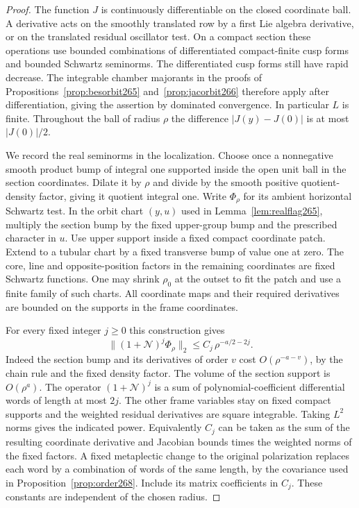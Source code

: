 \documentclass[a4paper,11pt]{article}
\theoremstyle{definition}
\theoremstyle{remark}
\numberwithin{equation}{section}
\begin{document}
\begin{proof}
The function \(J\) is continuously differentiable on the
closed coordinate ball. A derivative acts on the smoothly
translated row by a first Lie algebra derivative, or on the
translated residual oscillator test. On a compact section
these operations use bounded combinations of differentiated
compact-finite cusp forms and bounded Schwartz seminorms.
The differentiated cusp forms still have rapid decrease.
The integrable chamber majorants in the proofs of
Propositions~\ref{prop:besorbit265} and~\ref{prop:jacorbit266}
therefore apply after differentiation, giving the assertion
by dominated convergence. In particular \(L\) is finite.
Throughout the ball of radius \(\rho\) the difference
\(|J(y)-J(0)|\) is at most \(|J(0)|/2\).

We record the real seminorms in the localization. Choose
once a nonnegative smooth product bump of integral one
supported inside the open unit ball in the section coordinates.
Dilate it by \(\rho\) and divide by the smooth positive
quotient-density factor, giving it quotient integral one.
Write \(\Phi_\rho\) for its ambient horizontal Schwartz test.
In the orbit chart \((y,u)\) used in
Lemma~\ref{lem:realflag265}, multiply the section bump by
the fixed upper-group bump and the prescribed character in
\(u\). Use upper support inside a fixed compact coordinate
patch. Extend to a tubular chart by a fixed transverse bump
of value one at zero. The core, line and opposite-position factors in the remaining
coordinates are fixed Schwartz functions. One may shrink \(\rho_0\) at
the outset to fit the patch and use a finite family of such
charts. All coordinate maps and their required derivatives
are bounded on the supports in the frame coordinates.

For every fixed integer \(j\ge0\) this construction gives
\[
       \|(1+\mathcal N)^j\Phi_\rho\|_2
                    \le C_j\,\rho^{-a/2-2j}.
\]
Indeed the section bump and its derivatives of order \(v\)
cost \(O(\rho^{-a-v})\), by the chain rule and the fixed
density factor. The volume of the section support is
\(O(\rho^a)\). The operator \((1+\mathcal N)^j\) is a sum
of polynomial-coefficient differential words of length at
most \(2j\). The other frame variables stay on fixed compact
supports and the weighted residual derivatives are square
integrable. Taking \(L^2\) norms gives the indicated power.
Equivalently \(C_j\) can be taken as the sum of the resulting
coordinate derivative and Jacobian bounds times the weighted
norms of the fixed factors. A fixed metaplectic change to the
original polarization replaces each word by a combination
of words of the same length, by the covariance used in
Proposition~\ref{prop:order268}. Include its matrix
coefficients in \(C_j\). These constants are independent of
the chosen radius.


\end{proof}
\end{document}
